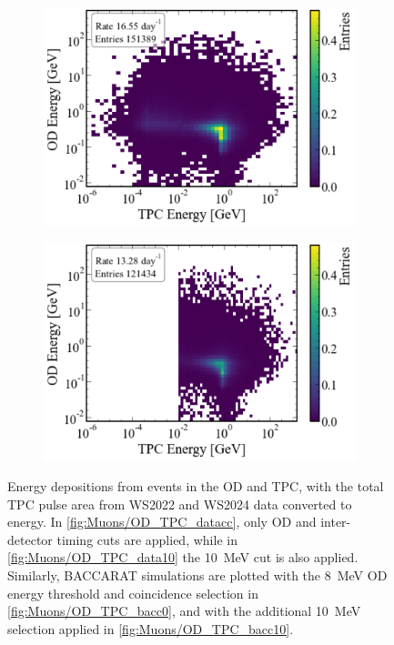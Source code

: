 \begin{figure}[h!]
\begin{subfigure}{0.49\textwidth}
    \includegraphics[width=\textwidth]{figures/Muons/OD_TPC_bacc0.pdf}
    \caption{}
    \label{fig:Muons/OD_TPC_bacc0}
    \end{subfigure}
    \begin{subfigure}{0.49\textwidth}
    \centering
    \includegraphics[width=\textwidth]{figures/Muons/OD_TPC_bacc10.pdf}
    \caption{}
    \label{fig:Muons/OD_TPC_bacc10}
    \end{subfigure}
    \caption[Energy depositions from events in the OD and TPC, with the total TPC pulse area from WS2022 and WS2024 data converted to energy.]{Energy depositions from events in the OD and TPC, with the total TPC pulse area from WS2022 and WS2024 data converted to energy. In \autoref{fig:Muons/OD_TPC_datacc}, only OD and inter-detector timing cuts are applied, while in \autoref{fig:Muons/OD_TPC_data10} the 10~MeV cut is also applied. Similarly, BACCARAT simulations are plotted with the 8~MeV OD energy threshold and coincidence selection in \autoref{fig:Muons/OD_TPC_bacc0}, and with the additional 10~MeV selection applied in \autoref{fig:Muons/OD_TPC_bacc10}.}
    \label{fig:Muons/ODTPC_comp}
\end{figure}

